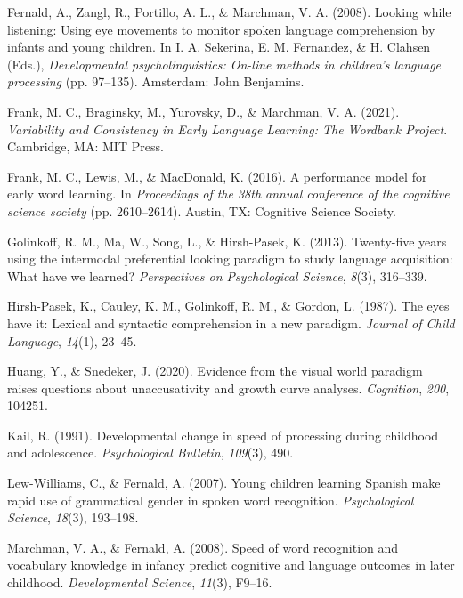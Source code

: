 \documentclass[10pt, letterpaper]{article}
\begin{document}
\leavevmode\hypertarget{ref-Fernald2008}{}%
Fernald, A., Zangl, R., Portillo, A. L., \& Marchman, V. A. (2008).
Looking while listening: Using eye movements to monitor spoken language
comprehension by infants and young children. In I. A. Sekerina, E. M.
Fernandez, \& H. Clahsen (Eds.), \emph{Developmental psycholinguistics:
On-line methods in children's language processing} (pp. 97--135).
Amsterdam: John Benjamins.

\leavevmode\hypertarget{ref-frank2021}{}%
Frank, M. C., Braginsky, M., Yurovsky, D., \& Marchman, V. A. (2021).
\emph{Variability and Consistency in Early Language Learning: The
Wordbank Project}. Cambridge, MA: MIT Press.

\leavevmode\hypertarget{ref-frank2016b}{}%
Frank, M. C., Lewis, M., \& MacDonald, K. (2016). A performance model
for early word learning. In \emph{Proceedings of the 38th annual
conference of the cognitive science society} (pp. 2610--2614). Austin,
TX: Cognitive Science Society.

\leavevmode\hypertarget{ref-Golinkoff2013}{}%
Golinkoff, R. M., Ma, W., Song, L., \& Hirsh-Pasek, K. (2013).
Twenty-five years using the intermodal preferential looking paradigm to
study language acquisition: What have we learned? \emph{Perspectives on
Psychological Science}, \emph{8}(3), 316--339.

\leavevmode\hypertarget{ref-Hirsh-Pasek1987}{}%
Hirsh-Pasek, K., Cauley, K. M., Golinkoff, R. M., \& Gordon, L. (1987).
The eyes have it: Lexical and syntactic comprehension in a new paradigm.
\emph{Journal of Child Language}, \emph{14}(1), 23--45.

\leavevmode\hypertarget{ref-Huang2020}{}%
Huang, Y., \& Snedeker, J. (2020). Evidence from the visual world
paradigm raises questions about unaccusativity and growth curve
analyses. \emph{Cognition}, \emph{200}, 104251.

\leavevmode\hypertarget{ref-kail1991}{}%
Kail, R. (1991). Developmental change in speed of processing during
childhood and adolescence. \emph{Psychological Bulletin}, \emph{109}(3),
490.

\leavevmode\hypertarget{ref-Lew-Williams2007}{}%
Lew-Williams, C., \& Fernald, A. (2007). Young children learning Spanish
make rapid use of grammatical gender in spoken word recognition.
\emph{Psychological Science}, \emph{18}(3), 193--198.

\leavevmode\hypertarget{ref-Marchman2008}{}%
Marchman, V. A., \& Fernald, A. (2008). Speed of word recognition and
vocabulary knowledge in infancy predict cognitive and language outcomes
in later childhood. \emph{Developmental Science}, \emph{11}(3), F9--16.
\end{document}
